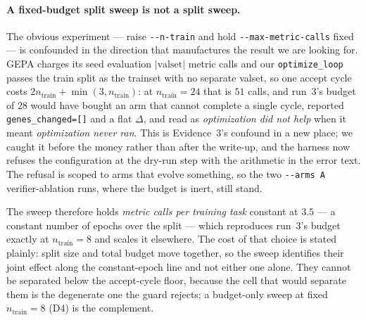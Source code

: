 \documentclass[11pt]{article}
\newcommand{\dd}{\ensuremath{\Delta}}
\begin{document}
\paragraph{A fixed-budget split sweep is not a split sweep.} The obvious experiment --- raise
\texttt{-{}-n-train} and hold \texttt{-{}-max-metric-calls} fixed --- is confounded in the
direction that manufactures the result we are looking for. GEPA charges its seed evaluation
$|\mathrm{valset}|$ metric calls and our \texttt{optimize\_loop} passes the train split as the
trainset with no separate valset, so one accept cycle costs
$2n_{\mathrm{train}} + \min(3, n_{\mathrm{train}})$: at $n_{\mathrm{train}}{=}24$ that is $51$
calls, and run~3's budget of $28$ would have bought an arm that cannot complete a single cycle,
reported \texttt{genes\_changed=[]} and a flat $\dd$, and read as \emph{optimization did not help}
when it meant \emph{optimization never ran}. This is Evidence~3's confound in a new place; we
caught it before the money rather than after the write-up, and the harness now refuses the
configuration at the dry-run step with the arithmetic in the error text. The refusal is scoped to
arms that evolve something, so the two \texttt{-{}-arms A} verifier-ablation runs, where the budget
is inert, still stand.

The sweep therefore holds \emph{metric calls per training task} constant at $3.5$ --- a
constant number of epochs over the split --- which reproduces run~3's budget exactly at
$n_{\mathrm{train}}{=}8$ and scales it elsewhere. The cost of that choice is stated plainly:
split size and total budget move together, so the sweep identifies their joint effect along
the constant-epoch line and not either one alone. They cannot be separated below the
accept-cycle floor, because the cell that would separate them is the degenerate one the guard
rejects; a budget-only sweep at fixed $n_{\mathrm{train}}{=}8$ (D4) is the complement.
\end{document}
